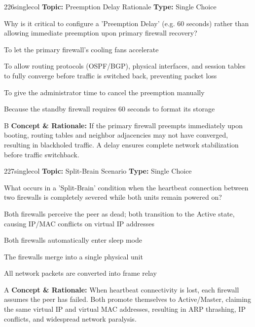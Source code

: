 \begin{qcard}{226}{singlecol}
\textcolor{darkslate!75}{\small\textbf{Topic:} Preemption Delay Rationale \hfill \textbf{Type:} Single Choice}\vspace{0.4em}\par
Why is it critical to configure a 'Preemption Delay' (e.g. 60 seconds) rather than allowing immediate preemption upon primary firewall recovery?
\begin{qoptions}
\item To let the primary firewall's cooling fans accelerate
\item To allow routing protocols (OSPF/BGP), physical interfaces, and session tables to fully converge before traffic is switched back, preventing packet loss
\item To give the administrator time to cancel the preemption manually
\item Because the standby firewall requires 60 seconds to format its storage
\end{qoptions}
\end{qcard}
\nopagebreak
\begin{explainbox}{B}
\textbf{Concept \& Rationale:} If the primary firewall preempts immediately upon booting, routing tables and neighbor adjacencies may not have converged, resulting in blackholed traffic. A delay ensures complete network stabilization before traffic switchback.
\end{explainbox}

\begin{qcard}{227}{singlecol}
\textcolor{darkslate!75}{\small\textbf{Topic:} Split-Brain Scenario \hfill \textbf{Type:} Single Choice}\vspace{0.4em}\par
What occurs in a 'Split-Brain' condition when the heartbeat connection between two firewalls is completely severed while both units remain powered on?
\begin{qoptions}
\item Both firewalls perceive the peer as dead; both transition to the Active state, causing IP/MAC conflicts on virtual IP addresses
\item Both firewalls automatically enter sleep mode
\item The firewalls merge into a single physical unit
\item All network packets are converted into frame relay
\end{qoptions}
\end{qcard}
\nopagebreak
\begin{explainbox}{A}
\textbf{Concept \& Rationale:} When heartbeat connectivity is lost, each firewall assumes the peer has failed. Both promote themselves to Active/Master, claiming the same virtual IP and virtual MAC addresses, resulting in ARP thrashing, IP conflicts, and widespread network paralysis.
\end{explainbox}

